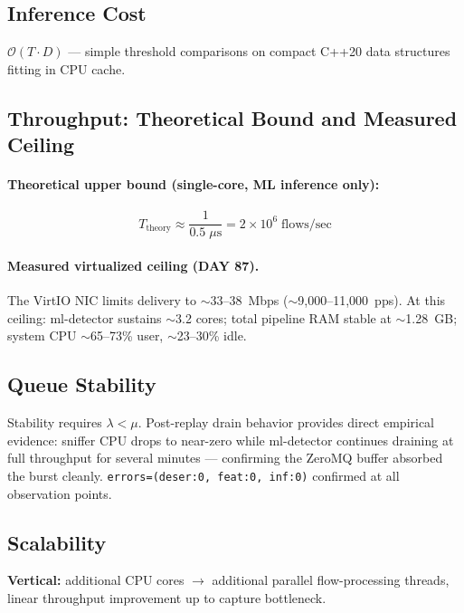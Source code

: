 \documentclass[11pt,a4paper]{article}
\begin{document}
\subsection{Inference Cost}

$\mathcal{O}(T \cdot D)$ --- simple threshold comparisons on compact C++20 data structures
fitting in CPU cache.

\subsection{Throughput: Theoretical Bound and Measured Ceiling}

\paragraph{Theoretical upper bound (single-core, ML inference only):}
\begin{equation}
  T_{\text{theory}} \approx \frac{1}{0.5\;\mu\text{s}} = 2 \times 10^6\;\text{flows/sec}
\end{equation}

\paragraph{Measured virtualized ceiling (DAY 87).}
The VirtIO NIC limits delivery to ${\sim}$33--38~Mbps (${\sim}$9,000--11,000~pps).
At this ceiling: ml-detector sustains ${\sim}$3.2 cores; total pipeline RAM stable at
${\sim}$1.28~GB; system CPU ${\sim}$65--73\% user, ${\sim}$23--30\% idle.

\subsection{Queue Stability}

Stability requires $\lambda < \mu$. Post-replay drain behavior provides direct empirical
evidence: sniffer CPU drops to near-zero while ml-detector continues draining at full
throughput for several minutes --- confirming the ZeroMQ buffer absorbed the burst cleanly.
\texttt{errors=(deser:0, feat:0, inf:0)} confirmed at all observation points.

\subsection{Scalability}

\textbf{Vertical:} additional CPU cores $\to$ additional parallel flow-processing threads,
linear throughput improvement up to capture bottleneck.
\end{document}
